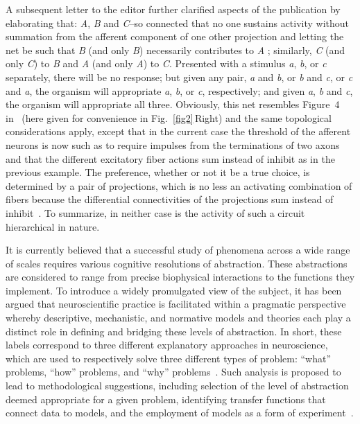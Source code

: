 \documentclass[10pt,letterpaper]{article}
\begin{document}
A subsequent letter to the editor further clarified aspects of the publication by elaborating that: {\it{A}}, {\it{B}} and {\it{C}}--so connected that no one sustains activity without summation from the afferent component of one other projection and letting the net be such that {\it{B}} (and only {\it{B}}) necessarily contributes to {\it{A}} ; similarly, {\it{C}} (and only {\it{C}}) to {\it{B}} and {\it{A}} (and only {\it{A}}) to {\it{C}}. Presented with a stimulus {\it{a}}, {\it{b}}, or {\it{c}} separately, there will be no response; but given any pair, {\it{a}} and {\it{b}}, or {\it{b}} and {\it{c}}, or {\it{c}} and {\it{a}}, the organism will appropriate {\it{a}}, {\it{b}}, or {\it{c}}, respectively; and given {\it{a}}, {\it{b}} and {\it{c}}, the organism will appropriate all three. Obviously, this net resembles Figure~4 in~\cite{mcculloch45a} (here given for convenience in Fig.~\ref{fig2}\,Right) and the same topological considerations apply, except that in the current case the threshold of the afferent neurons is now such as to require impulses from the terminations of two axons and that the different excitatory fiber actions sum instead of inhibit as in the previous example. The preference, whether or not it be a true choice, is determined by a pair of projections, which is no less an activating combination of fibers because the differential connectivities of the projections sum instead of inhibit~\cite{mcculloch45b}. To summarize, in neither case is the activity of such a circuit hierarchical in nature.

It is currently believed that a successful study of phenomena across a wide range of scales requires various cognitive resolutions of abstraction. These abstractions are considered to range from precise biophysical interactions to the functions they implement. To introduce a widely promulgated view of the subject, it has been argued that neuroscientific practice is facilitated within a pragmatic perspective whereby descriptive, mechanistic, and normative models and theories each play a distinct role in defining and bridging these levels of abstraction. In short, these labels correspond to three different explanatory approaches in neuroscience, which are used to respectively solve three different types of problem: “what” problems, “how” problems, and “why” problems~\cite{dayan01}. Such analysis is proposed to lead to methodological suggestions, including selection of the level of abstraction deemed appropriate for a given problem, identifying transfer functions that connect data to models, and the employment of models as a form of experiment~\cite{levenstein23}.
\end{document}
